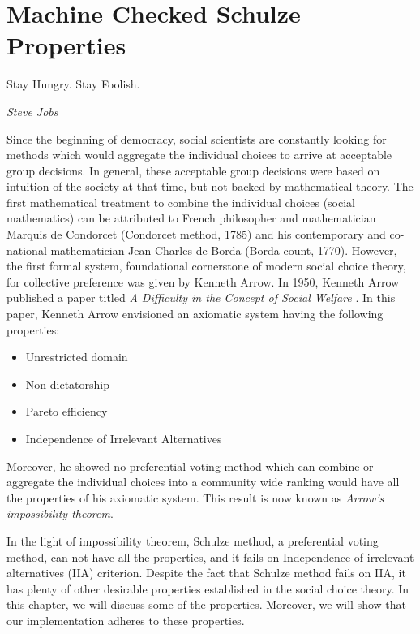 \chapter{Machine Checked Schulze Properties}
\label{cha:machine_checked}

\epigraph{Stay Hungry. Stay Foolish.} 
{\textit{Steve Jobs}} 


 Since the beginning of democracy, social scientists are constantly looking for methods  which would 
 aggregate the individual choices  to arrive at acceptable group decisions. 
 In general, these acceptable group decisions were based on intuition of the society at that time,
 but not backed by mathematical theory. The first mathematical 
 treatment to combine the individual choices (social mathematics)  can be 
 attributed to French philosopher and mathematician Marquis de Condorcet (Condorcet method, 1785) and his contemporary
 and co-national mathematician Jean-Charles de Borda (Borda count, 1770). However, the first formal system, foundational cornerstone
 of modern social choice theory, for collective preference was given by Kenneth Arrow. In 1950, Kenneth Arrow 
 published a paper titled \textit{A Difficulty in the Concept of Social Welfare} \citep{arrow1950difficulty}. 
 In this paper, Kenneth Arrow envisioned an axiomatic system having the following properties:
 
 \begin{itemize}
 \item Unrestricted domain
 \item Non-dictatorship
 \item Pareto efficiency
 \item Independence of Irrelevant Alternatives
 \end{itemize}
 
 Moreover, he showed no preferential voting method which can combine or aggregate the individual choices into a community wide 
 ranking would have all the properties of his axiomatic system. This result is now known as \textit{Arrow's impossibility theorem}. 


 In the light of impossibility theorem, Schulze method, a preferential voting method, can not have all the properties, and it fails on 
 Independence of irrelevant alternatives (IIA) criterion. Despite the fact that Schulze method fails on IIA,  it has plenty of other desirable
 properties established in the social choice theory. In this chapter, we will discuss some of 
 the properties.  Moreover, we will show that our implementation adheres to these properties. 
 
